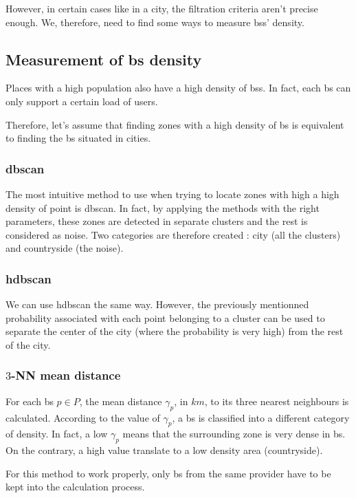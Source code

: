 \documentclass[lettersize,journal,english]{IEEEtran}
\begin{document}
    However, in certain cases like in a city, the filtration criteria aren't precise enough. We, therefore, need to find some ways to measure \acrshort{bs}s' density.

    \subsection{Measurement of \acrshort{bs} density}
        Places with a high population also have a high density of \acrshort{bs}s. In fact, each \acrshort{bs} can only support a certain load of users.

        Therefore, let's assume that finding zones with a high density of \acrshort{bs} is equivalent to finding the \acrshort{bs} situated in \og cities\fg{}.

        \subsubsection{\acrshort{dbscan}}
            The most intuitive method to use when trying to locate zones with high a high density of point is \acrshort{dbscan}. In fact, by applying the methods with the right parameters, these zones are detected in separate clusters and the rest is considered as noise. Two categories are therefore created : city (all the clusters) and countryside (the noise).

        \subsubsection{\acrshort{hdbscan}}
            We can use \acrshort{hdbscan} the same way. However, the previously mentionned probability associated with each point belonging to a cluster can be used to separate the center of the city (where the probability is very high) from the rest of the city.

        \subsubsection{$3$-NN mean distance}
            For each \acrshort{bs} $p\in P$, the mean distance $\gamma_p$, in $\unit{km}$, to its three nearest neighbours is calculated. According to the value of $\gamma_p$, a \acrshort{bs} is classified into a different category of density. In fact, a low $\gamma_p$ means that the surrounding zone is very dense in \acrshort{bs}. On the contrary, a high value translate to a low density area (countryside).

            For this method to work properly, only \acrshort{bs} from the same provider have to be kept into the calculation process.
\end{document}
